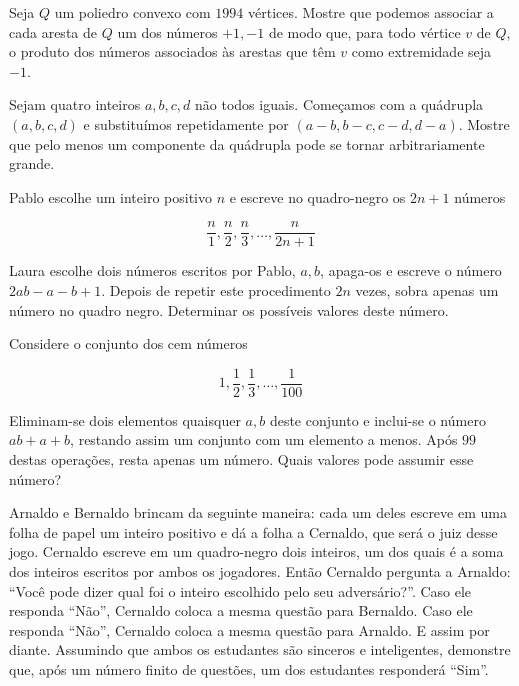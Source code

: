 \begin{questao}
  Seja $Q$ um poliedro convexo com $1994$ vértices. Mostre que podemos associar
  a cada aresta de $Q$ um dos números $+1,-1$ de modo que, para todo vértice $v$
  de $Q$, o produto dos números associados às arestas que têm $v$ como
  extremidade seja $-1$.

\end{questao}

\begin{questao}
  Sejam quatro inteiros $a,b,c,d$ não todos iguais. Começamos com a quádrupla
  $(a,b,c,d)$ e substituímos repetidamente por $(a-b,b-c,c-d,d-a)$. Mostre que
  pelo menos um componente da quádrupla pode se tornar arbitrariamente grande.
\end{questao}

\begin{questao}
  Pablo escolhe um inteiro positivo $n$ e escreve no quadro-negro os $2n+1$
  números

  $$ \frac{n}{1},\frac{n}{2},\frac{n}{3},\ldots,\frac{n}{2n+1}$$

  Laura escolhe dois números escritos por Pablo, $a,b$, apaga-os e escreve o
  número $2ab-a-b+1$. Depois de repetir este procedimento $2n$ vezes, sobra
  apenas um número no quadro negro. Determinar os possíveis valores deste
  número.

\end{questao}

\begin{questao}
  Considere o conjunto dos cem números

  $$1,\frac{1}{2},\frac{1}{3},\ldots,\frac{1}{100}$$

  Eliminam-se dois elementos quaisquer $a,b$ deste conjunto e inclui-se o número
  $ab+a+b$, restando assim um conjunto com um elemento a menos. Após $99$ destas
  operações, resta apenas um número. Quais valores pode assumir esse número?
\end{questao}

\begin{questao}
  Arnaldo e Bernaldo brincam da seguinte maneira: cada um deles escreve em uma
  folha de papel um inteiro positivo e dá a folha a Cernaldo, que será o juiz
  desse jogo. Cernaldo escreve em um quadro-negro dois inteiros, um dos quais é
  a soma dos inteiros escritos por ambos os jogadores. Então Cernaldo pergunta a
  Arnaldo: ``Você pode dizer qual foi o inteiro escolhido pelo seu
  adversário?''. Caso ele responda ``Não'', Cernaldo coloca a mesma questão para
  Bernaldo. Caso ele responda ``Não'', Cernaldo coloca a mesma questão para
  Arnaldo. E assim por diante. Assumindo que ambos os estudantes são sinceros e
  inteligentes, demonstre que, após um número finito de questões, um dos
  estudantes responderá ``Sim''.
\end{questao}

